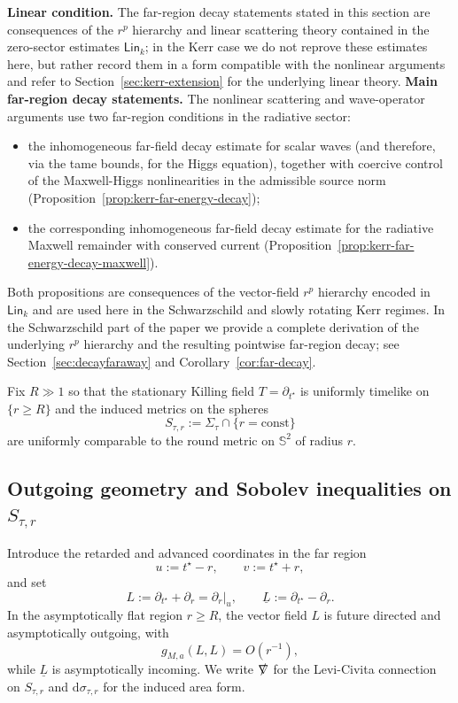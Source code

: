 \documentclass[11pt]{article}
\numberwithin{equation}{section}
\theoremstyle{plain}
\theoremstyle{definition}
\theoremstyle{remark}
\newcommand{\dd}{\mathrm{d}}
\newcommand{\Lin}{\mathsf{Lin}}
\begin{document}
\noindent\textbf{Linear condition.} The far-region decay statements stated in this section are consequences of the $r^{p}$ hierarchy and linear scattering theory contained in the zero-sector estimates $\Lin_{k}$; in the Kerr case we do not reprove these estimates here, but rather record them in a form compatible with the nonlinear arguments and refer to Section~\ref{sec:kerr-extension} for the underlying linear theory.
\medskip
\noindent\textbf{Main far-region decay statements.}
The nonlinear scattering and wave-operator arguments use two far-region conditions in the radiative sector:
\begin{itemize}
\item the inhomogeneous far-field decay estimate for scalar waves (and therefore, via the tame bounds, for the Higgs equation), together with coercive control of the Maxwell-Higgs nonlinearities in the admissible source norm (Proposition~\ref{prop:kerr-far-energy-decay});
\item the corresponding inhomogeneous far-field decay estimate for the radiative Maxwell remainder with conserved current (Proposition~\ref{prop:kerr-far-energy-decay-maxwell}).
\end{itemize}
Both propositions are consequences of the vector-field $r^{p}$ hierarchy encoded in $\Lin_{k}$ and are used here in the Schwarzschild and slowly rotating Kerr regimes. In the Schwarzschild part of the paper we provide a complete derivation of the underlying $r^{p}$ hierarchy and the resulting pointwise far-region decay; see Section~\ref{sec:decayfaraway} and Corollary~\ref{cor:far-decay}.
\medskip

Fix $R\gg1$ so that the stationary Killing field $T=\partial_{t^{\star}}$ is uniformly timelike on $\{r\ge R\}$ and the induced metrics on the spheres
\begin{equation}
S_{\tau,r}:=\Sigma_{\tau}\cap\{r=\mathrm{const}\}
\end{equation}
are uniformly comparable to the round metric on $\mathbb S^{2}$ of radius $r$.

\subsection{Outgoing geometry and Sobolev inequalities on \texorpdfstring{$S_{\tau,r}$}{S(tau,r)}}\label{subsec:kerr-far-geom}

Introduce the retarded and advanced coordinates in the far region
\begin{equation}\label{eq:kerr-uv}
u:=t^{\star}-r,\qquad v:=t^{\star}+r,
\end{equation}
and set
\begin{equation}
L:=\partial_{t^{\star}}+\partial_{r}=\partial_{r}\big|_{u},
\qquad
\underline L:=\partial_{t^{\star}}-\partial_{r}.
\end{equation}
In the asymptotically flat region $r\ge R$, the vector field $L$ is future directed and asymptotically outgoing, with
\begin{equation}
g_{M,a}(L,L)=O(r^{-1}),
\end{equation}
while $\underline L$ is asymptotically incoming.
We write $\slashed{\nabla}$ for the Levi-Civita connection on $S_{\tau,r}$ and $\dd\sigma_{\tau,r}$ for the induced area form.
\end{document}
